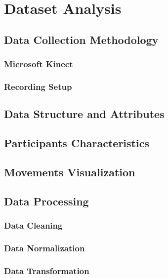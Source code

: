 %
%
\chapter{Dataset Analysis}
    \section{Data Collection Methodology}
        \subsection{Microsoft Kinect}
        \subsection{Recording Setup}
    \section{Data Structure and Attributes}
    \section{Participants Characteristics}
    \section{Movements Visualization}
    \section{Data Processing}
        \subsection{Data Cleaning}
        \subsection{Data Normalization}
        \subsection{Data Transformation}
\cleardoublepage